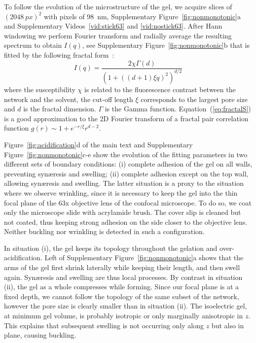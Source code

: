 \documentclass[twocolumn,superscriptaddress,showpacs,preprintnumbers,
amsmath,amssymb,prl]{revtex4-1}
\begin{document}
To follow the evolution of the microstructure of the gel, we acquire slices of $(\SI{2048}{px})^2$ with pixels of \SI{98}{\nano\metre}, Supplementary Figure~\ref{fig:nonmonotonic}a and Supplementary Videos~\ref{vid:stick63} and \ref{vid:nostick63}. After Hann windowing we perform Fourier transform and radially average the resulting spectrum to obtain $I(q)$, see Supplementary Figure~\ref{fig:nonmonotonic}b that is fitted by the following fractal form~\cite{VanDijk1986}:
\begin{equation}
I(q) = \frac{2\chi\Gamma(d)}{\left(1+\left((d+1)\xi q\right)^2\right)^{d/2}}
\label{eq:fractalS}
\end{equation}
where the susceptibility $\chi$ is related to the fluorescence contrast between the network and the solvent, the cut-off length $\xi$ corresponds to the largest pore size and $d$ is the fractal dimension. $\Gamma$ is the Gamma function. Equation~(\ref{eq:fractalS}) is a good approximation to the 2D Fourier transform of a fractal pair correlation function $g(r) \sim 1+ e^{-r/\xi} r^{d-2}$.

Figure~\ref{fig:acidification}d of the main text and Supplementary Figure~\ref{fig:nonmonotonic}c-e show the evolution of the fitting parameters in two different sets of boundary conditions: (i) complete adhesion of the gel on all walls, preventing syn\ae{}resis and swelling; (ii) complete adhesion except on the top wall, allowing syn\ae{}resis and swelling. The latter situation is a proxy to the situation where we observe wrinkling, since it is necessary to keep the gel into the thin focal plane of the 63x objective lens of the confocal microscope. To do so, we coat only the microscope slide with acrylamide brush. The cover slip is cleaned but not coated, thus keeping strong adhesion on the side closer to the objective lens. Neither buckling nor wrinkling is detected in such a configuration.

In situation (i), the gel keeps its topology throughout the gelation and over-acidification. Left of Supplementary Figure~\ref{fig:nonmonotonic}a shows that the arms of the gel first shrink laterally while keeping their length, and then swell again. Syn\ae{}resis and swelling are thus local processes. By contrast in situation (ii), the gel as a whole compresses while forming. Since our focal plane is at a fixed depth, we cannot follow the topology of the same subset of the network, however the pore size is clearly smaller than in situation (ii). The isoelectric gel, at minimum gel volume, is probably isotropic or only marginally anisotropic in $z$. This explains that subsequent swelling is not occurring only along $z$ but also in plane, causing buckling.
\end{document}
